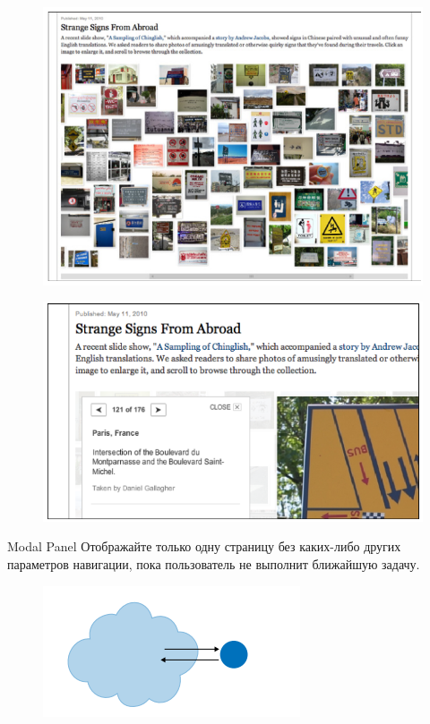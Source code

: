 \documentclass{beamer}
\begin{document}
\begin{frame}[t]
	\begin{figure}[h]
		\centering
		\includegraphics[scale=0.35]{images/lec07-pic29.png}
	\end{figure}
	\begin{figure}[h]
		\centering
		\includegraphics[scale=0.35]{images/lec07-pic30.png}
	\end{figure}
\end{frame}

\begin{frame}[t]{Modal Panel}
	Отображайте только одну страницу без каких-либо других параметров навигации, пока пользователь не выполнит ближайшую задачу. 
	\begin{figure}[h]
		\centering
		\includegraphics[scale=0.75]{images/lec07-pic31.png}
	\end{figure}
\end{frame}
\end{document}
